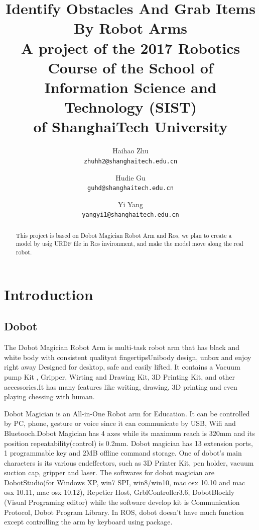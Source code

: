\documentclass[10pt,twocolumn,letterpaper]{article}
\begin{document}
\title{
Identify Obstacles And Grab Items By Robot Arms \\
\bigskip
\large A project of the	2017 Robotics Course of	the	School of \\
Information Science and Technology (SIST) \\
of ShanghaiTech University}


\author{Haihao Zhu\\
{\tt\small zhuhh2@shanghaitech.edu.cn}
\and
Hudie Gu\\
{\tt\small guhd@shanghaitech.edu.cn}
\and
Yi Yang\\
{\tt\small yangyi1@shanghaitech.edu.cn}
}
\maketitle

\begin{abstract}
   This project is based on Dobot Magician Robot Arm and Ros, we plan to create a model by usig URDF file in Ros invironment, and make the model move along the real robot.
   
\end{abstract}

\section{Introduction}

\subsection{Dobot}
The Dobot Magician Robot Arm is multi-task robot arm that has black and white body with consistent qualityat fingertipsUnibody design, unbox and enjoy right away Designed for desktop, safe and easily lifted. It contains a Vacuum pump Kit , Gripper, Wirting and Drawing Kit, 3D Printing Kit, and other accessories.It has many features like writing, drawing, 3D printing and even playing chessing with human.

Dobot Magician is an All-in-One Robot arm for Education. It can be controlled by PC, phone, gesture or voice since it can communicate by USB, Wifi and Bluetooch.Dobot Magician has 4 axes while its maximum reach is 320mm and its position repeatability(control) is 0.2mm. Dobot magician has 13 extension ports, 1 programmable key and 2MB offline command storage. One of dobot’s main characters is its various endeffectors, such as 3D Printer Kit, pen holder, vacuum suction cap, gripper and laser. The softwares for dobot magician are DobotStudio(for Windows XP, win7 SPI, win8/win10, mac osx 10.10 and mac osx 10.11, mac osx 10.12), Repetier Host, GrblController3.6, DobotBlockly (Visual Programing editor) while the software develop kit is Communication Protocol, Dobot Program Library. In ROS, dobot doesn’t have much function except controlling the arm by keyboard using package.
\end{document}
